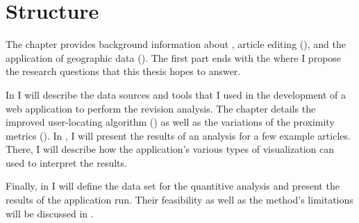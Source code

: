 \section{Structure}

The chapter  provides background information about , article editing (), and the application of geographic data ().
The first part ends with the  where I propose the research questions that this thesis hopes to answer.

In  I will describe the data sources and tools that I used in the development of a web application to perform the revision analysis. 
The chapter details the improved user-locating algorithm () as well as the variations of the proximity metrics ().
In , I will present the results of an analysis for a few example articles.
There, I will describe how the application's various types of visualization can used to interpret the results.

Finally, in  I will define the data set for the quantitive analysis and present the results of the application run.
Their feasibility as well as the method's limitations will be discussed in .